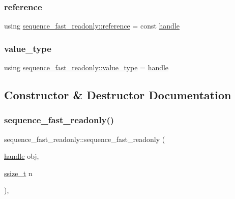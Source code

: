 \subsubsection{\texorpdfstring{reference}{reference}}
{\footnotesize\ttfamily using \mbox{\hyperlink{classsequence__fast__readonly_a7b285c12cc5332e8fc7998bcab092fa7}{sequence\+\_\+fast\+\_\+readonly\+::reference}} =  const \mbox{\hyperlink{classhandle}{handle}}\hspace{0.3cm}{\ttfamily [protected]}}

\mbox{\label{classsequence__fast__readonly_ac5ad251551c7938c6a6a7e565b8788d0}} 
\subsubsection{\texorpdfstring{value\_type}{value\_type}}
{\footnotesize\ttfamily using \mbox{\hyperlink{classsequence__fast__readonly_ac5ad251551c7938c6a6a7e565b8788d0}{sequence\+\_\+fast\+\_\+readonly\+::value\+\_\+type}} =  \mbox{\hyperlink{classhandle}{handle}}\hspace{0.3cm}{\ttfamily [protected]}}



\subsection{Constructor \& Destructor Documentation}
\mbox{\label{classsequence__fast__readonly_aadd473034fbf872253a773156515da81}} 
\subsubsection{\texorpdfstring{sequence\_fast\_readonly()}{sequence\_fast\_readonly()}}
{\footnotesize\ttfamily sequence\+\_\+fast\+\_\+readonly\+::sequence\+\_\+fast\+\_\+readonly (\begin{DoxyParamCaption}\item[{\mbox{\hyperlink{classhandle}{handle}}}]{obj,  }\item[{\mbox{\hyperlink{detail_2common_8h_ac430d16fc097b3bf0a7469cfd09decda}{ssize\+\_\+t}}}]{n }\end{DoxyParamCaption})\hspace{0.3cm}{\ttfamily [inline]}, {\ttfamily [protected]}}



